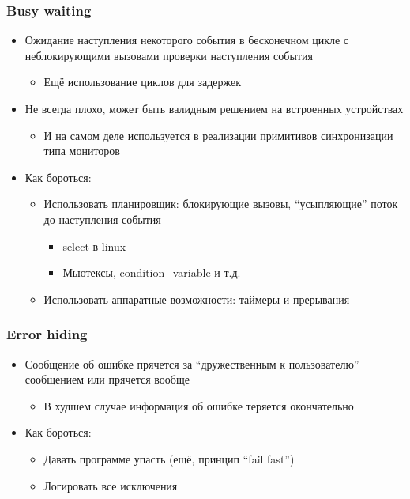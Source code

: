 \documentclass[xetex,mathserif,serif]{beamer}
\begin{document}
	\begin{frame}
		\frametitle{Busy waiting}
		\begin{itemize}
			\item Ожидание наступления некоторого события в бесконечном цикле с неблокирующими вызовами проверки наступления события
			\begin{itemize}
				\item Ещё использование циклов для задержек
			\end{itemize}
			\item Не всегда плохо, может быть валидным решением на встроенных устройствах
			\begin{itemize}
				\item И на самом деле используется в реализации примитивов синхронизации типа мониторов
			\end{itemize}
			\item Как бороться:
			\begin{itemize}
				\item Использовать планировщик: блокирующие вызовы, ``усыпляющие'' поток до наступления события
				\begin{itemize}
					\item select в linux
					\item Мьютексы, condition\_variable и т.д.
				\end{itemize}
				\item Использовать аппаратные возможности: таймеры и прерывания
			\end{itemize}
		\end{itemize}
	\end{frame}

	\begin{frame}
		\frametitle{Error hiding}
		\begin{itemize}
			\item Сообщение об ошибке прячется за ``дружественным к пользователю'' сообщением или прячется вообще
			\begin{itemize}
				\item В худшем случае информация об ошибке теряется окончательно
			\end{itemize}
			\item Как бороться:
			\begin{itemize}
				\item Давать программе упасть (ещё, принцип ``fail fast'')
				\item Логировать все исключения
			\end{itemize}
		\end{itemize}
	\end{frame}
\end{document}
